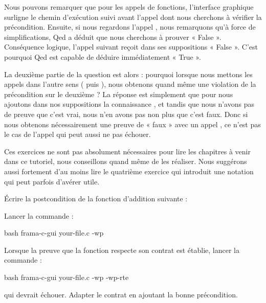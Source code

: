 

Nous pouvons remarquer que pour les appels de fonctions, l'interface graphique
surligne le chemin d'exécution suivi avant l'appel dont nous cherchons à
vérifier la précondition. Ensuite, si nous regardons l'appel ,
nous remarquons qu'à force de simplifications, Qed a déduit que nous
cherchons à prouver « False ». Conséquence logique, l'appel suivant 
reçoit dans ses suppositions « False ». C'est pourquoi Qed est capable de déduire
immédiatement « True ».



La deuxième partie de la question est alors : pourquoi lorsque nous mettons les
appels dans l'autre sens ( puis ), nous obtenons
quand même une violation de la précondition sur le deuxième ? La réponse est
simplement que pour  nous ajoutons dans nos suppositions la
connaissance , et tandis que nous n'avons pas de preuve
que c'est vrai, nous n'en avons pas non plus que c'est faux. Donc si nous obtenons
nécessairement une preuve de « faux » avec un appel , ce n'est
pas le cas de l'appel  qui peut aussi ne pas échouer.




Ces exercices ne sont pas absolument nécessaires pour lire les chapitres à
venir dans ce tutoriel, nous conseillons quand même de les réaliser. Nous
suggérons aussi fortement d'au moins lire le quatrième exercice qui introduit
une notation qui peut parfois d'avérer utile.




Écrire la postcondition de la fonction d'addition suivante :




Lancer la commande :

\begin{CodeBlock}{bash}
frama-c-gui your-file.c -wp
\end{CodeBlock}


Lorsque la preuve que la fonction respecte son contrat est établie, lancer
la commande :

\begin{CodeBlock}{bash}
frama-c-gui your-file.c -wp -wp-rte
\end{CodeBlock}


qui devrait échouer. Adapter le contrat en ajoutant la bonne précondition.


